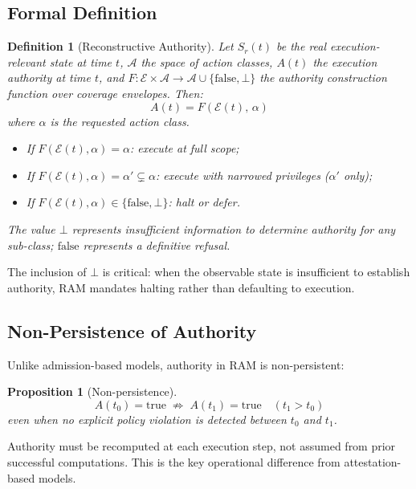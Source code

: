 \documentclass[11pt]{article}
\newtheorem{proposition}[theorem]{Proposition}
\newtheorem{definition}{Definition}[section]
\newcommand{\Sr}{S_r}
\newcommand{\Ndefval}{\bot}
\begin{document}
\subsection{Formal Definition}

\begin{definition}[Reconstructive Authority]
Let $\Sr(t)$ be the real execution-relevant state at time $t$,
$\mathcal{A}$ the space of action classes, $A(t)$ the execution authority
at time $t$, and
$F: \mathcal{E} \times \mathcal{A} \to \mathcal{A} \cup \{\text{false}, \Ndefval\}$
the authority construction function over coverage envelopes.
Then:
\[
A(t) = F\!\left(\mathcal{E}(t),\, \alpha\right)
\]
where $\alpha$ is the requested action class.
\begin{itemize}
  \item If $F(\mathcal{E}(t), \alpha) = \alpha$: execute at full scope;
  \item If $F(\mathcal{E}(t), \alpha) = \alpha' \subsetneq \alpha$:
        execute with narrowed privileges ($\alpha'$ only);
  \item If $F(\mathcal{E}(t), \alpha) \in \{\text{false}, \Ndefval\}$:
        halt or defer.
\end{itemize}
The value $\Ndefval$ represents \emph{insufficient information} to determine
authority for any sub-class; $\text{false}$ represents a definitive refusal.
\end{definition}

The inclusion of $\Ndefval$ is critical: when the observable state is
insufficient to establish authority, RAM mandates halting rather than
defaulting to execution.

\subsection{Non-Persistence of Authority}

Unlike admission-based models, authority in RAM is non-persistent:

\begin{proposition}[Non-persistence]
\[
A(t_0) = \text{true} \;\not\Rightarrow\; A(t_1) = \text{true} \quad (t_1 > t_0)
\]
even when no explicit policy violation is detected between $t_0$ and $t_1$.
\end{proposition}

Authority must be recomputed at each execution step, not assumed from prior
successful computations.
This is the key operational difference from attestation-based models.
\end{document}

